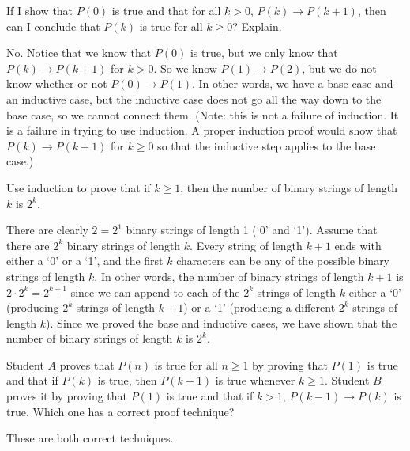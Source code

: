 \begin{requ}
If I show that $P(0)$ is true and that for all $k>0$, $P(k)\rightarrow P(k+1)$, then can I conclude
that $P(k)$ is true for all $k\geq 0$? Explain.
\begin{requanswer}
No. Notice that we know that $P(0)$ is true, but we only know that $P(k)\rightarrow P(k+1)$ for $k>0$.
So we know $P(1)\rightarrow P(2)$, but we do not know whether or not $P(0)\rightarrow P(1)$.
In other words, we have a base case and an inductive case, but the inductive case does not go all the
way down to the base case, so we cannot connect them. 
(Note: this is not a failure of induction. It is a failure in trying to use induction. A proper induction proof
would show that $P(k)\rightarrow P(k+1)$ for $k\geq 0$ so that the inductive step applies to the base case.)
\end{requanswer}
\end{requ}

\begin{requ}
Use induction to prove that if $k\geq 1$, then the number of binary strings of length $k$ is $2^k$.
\begin{requanswer}
There are clearly $2=2^1$ binary strings of length 1 (`0' and `1').
Assume that there are $2^k$ binary strings of length $k$.
Every string of length $k+1$ ends with either a `0' or a `1', and the first $k$ characters can 
be any of the possible binary strings of length $k$. In other words, the number of binary strings of length
$k+1$ is $2\cdot 2^k=2^{k+1}$ since we can append to each of the $2^k$ strings of length $k$ either a `0' (producing
$2^k$ strings of length $k+1$) or a `1' (producing a different $2^k$ strings of length $k$).
Since we proved the base and inductive cases, we have shown that the number of binary strings of length $k$ is $2^k$.
\end{requanswer}
\end{requ}

\begin{requ}
Student $A$ proves that $P(n)$ is true for all $n\geq 1$ by proving that 
$P(1)$ is true and that 
if $P(k)$ is true, then $P(k+1)$ is true whenever $k\geq 1$.
Student $B$ proves it by proving that $P(1)$ is true and that if $k>1$,  $P(k-1)\rightarrow P(k)$ is true.
Which one has a correct proof technique?
\begin{requanswer}
These are both correct techniques.
\end{requanswer}
\end{requ}

